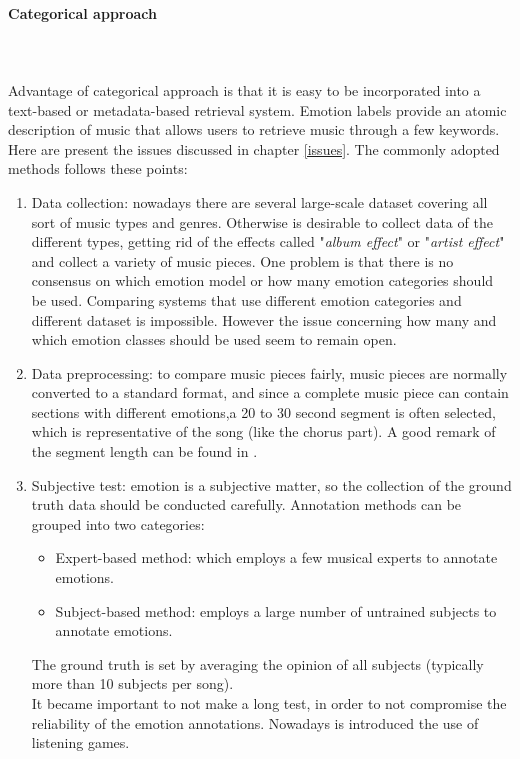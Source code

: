 \paragraph{Categorical approach}
\mbox{} \\ \\ \indent
Advantage of categorical approach is that it is easy to be incorporated into a text-based or metadata-based retrieval system. Emotion labels provide an atomic description of music that allows users to retrieve music through a few keywords. Here are present the issues discussed in chapter \ref{issues}.
The commonly adopted methods follows these points:
\begin{enumerate}
	\item Data collection: nowadays there are several large-scale dataset covering all sort of music types and genres. Otherwise is desirable to collect data of the different types, getting rid of the effects called "\textit{album effect}" or "\textit{artist effect}" and collect a variety of music pieces. One problem is that there is no consensus on which emotion model or how many emotion categories should be used. Comparing systems that use different emotion categories  and different dataset is impossible. However the issue concerning how many and which emotion classes should be used seem to remain open.
	\item Data preprocessing: to compare music pieces fairly, music pieces are normally converted to a standard format, and since a complete music piece can contain sections with different emotions,a 20 to 30 second segment is often selected, which is representative of the song (like the chorus part). A good remark of the segment length can be found in \cite{macdorman2007automatic}.
	\item Subjective test: emotion is a subjective matter, so the collection of the ground truth data should be conducted carefully. Annotation methods can be grouped into two categories:
	\begin{itemize}
		\item Expert-based method: which employs a few musical experts to annotate emotions.
		\item Subject-based method: employs a large number of untrained subjects to annotate emotions.
	\end{itemize}
	The ground truth is set by averaging the opinion of all subjects (typically more than 10 subjects per song).
	\\
	It became important to not make a long test, in order to not compromise the reliability of the emotion annotations. Nowadays is introduced the use of listening games.

\end{enumerate}
